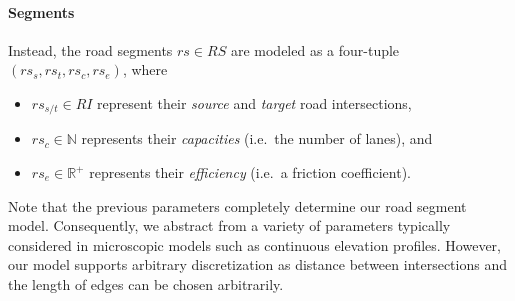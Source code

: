 
\paragraph{Segments}
\label{segments}

	Instead, the road segments $rs \in RS$ are modeled as a four-tuple $(rs_s, rs_t, rs_c, rs_e)$, where
	\begin{itemize}
		\item $rs_{s/t} \in RI$ represent their \textit{source} and \textit{target} road intersections,
		\item $rs_c \in \mathbb{N}$ represents their \textit{capacities} (i.e.\ the number of lanes), and
		\item $rs_e \in \mathbb{R}^+$ represents their \textit{efficiency} (i.e.\ a friction coefficient).
	\end{itemize}
	Note that the previous parameters completely determine our road segment model. Consequently, we abstract from a variety of parameters typically considered in microscopic models such as continuous elevation profiles. However, our model supports arbitrary discretization as distance between intersections and the length of edges can be chosen arbitrarily.


